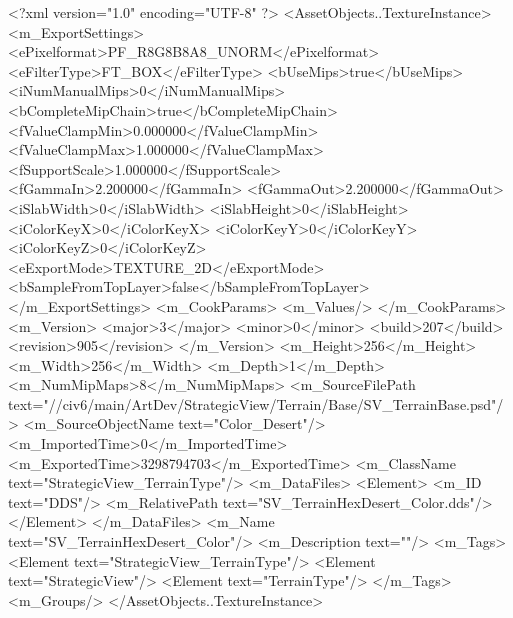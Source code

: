 <?xml version="1.0" encoding="UTF-8" ?>
<AssetObjects..TextureInstance>
	<m_ExportSettings>
		<ePixelformat>PF_R8G8B8A8_UNORM</ePixelformat>
		<eFilterType>FT_BOX</eFilterType>
		<bUseMips>true</bUseMips>
		<iNumManualMips>0</iNumManualMips>
		<bCompleteMipChain>true</bCompleteMipChain>
		<fValueClampMin>0.000000</fValueClampMin>
		<fValueClampMax>1.000000</fValueClampMax>
		<fSupportScale>1.000000</fSupportScale>
		<fGammaIn>2.200000</fGammaIn>
		<fGammaOut>2.200000</fGammaOut>
		<iSlabWidth>0</iSlabWidth>
		<iSlabHeight>0</iSlabHeight>
		<iColorKeyX>0</iColorKeyX>
		<iColorKeyY>0</iColorKeyY>
		<iColorKeyZ>0</iColorKeyZ>
		<eExportMode>TEXTURE_2D</eExportMode>
		<bSampleFromTopLayer>false</bSampleFromTopLayer>
	</m_ExportSettings>
	<m_CookParams>
		<m_Values/>
	</m_CookParams>
	<m_Version>
		<major>3</major>
		<minor>0</minor>
		<build>207</build>
		<revision>905</revision>
	</m_Version>
	<m_Height>256</m_Height>
	<m_Width>256</m_Width>
	<m_Depth>1</m_Depth>
	<m_NumMipMaps>8</m_NumMipMaps>
	<m_SourceFilePath text="//civ6/main/ArtDev/StrategicView/Terrain/Base/SV_TerrainBase.psd"/>
	<m_SourceObjectName text="Color_Desert"/>
	<m_ImportedTime>0</m_ImportedTime>
	<m_ExportedTime>3298794703</m_ExportedTime>
	<m_ClassName text="StrategicView_TerrainType"/>
	<m_DataFiles>
		<Element>
			<m_ID text="DDS"/>
			<m_RelativePath text="SV_TerrainHexDesert_Color.dds"/>
		</Element>
	</m_DataFiles>
	<m_Name text="SV_TerrainHexDesert_Color"/>
	<m_Description text=""/>
	<m_Tags>
		<Element text="StrategicView_TerrainType"/>
		<Element text="StrategicView"/>
		<Element text="TerrainType"/>
	</m_Tags>
	<m_Groups/>
</AssetObjects..TextureInstance>

